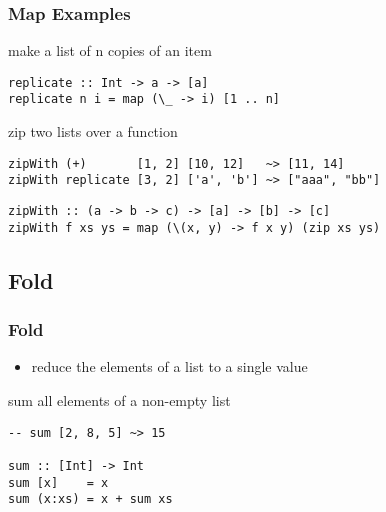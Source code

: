 \documentclass[dvipsnames]{beamer}
\theoremstyle{plain}
\begin{document}
\begin{frame}[fragile]
  \frametitle{Map Examples}

  \begin{exampleblock}{make a list of n copies of an item}
    \begin{lstlisting}[deletekeywords={replicate}]
replicate :: Int -> a -> [a]
replicate n i = map (\_ -> i) [1 .. n]
    \end{lstlisting}
  \end{exampleblock}

  \pause
  \begin{exampleblock}{zip two lists over a function}
    \begin{lstlisting}[frame=none]
zipWith (+)       [1, 2] [10, 12]   ~> [11, 14]
zipWith replicate [3, 2] ['a', 'b'] ~> ["aaa", "bb"]
    \end{lstlisting}

    \begin{lstlisting}[deletekeywords={zipWith}]
zipWith :: (a -> b -> c) -> [a] -> [b] -> [c]
zipWith f xs ys = map (\(x, y) -> f x y) (zip xs ys)
    \end{lstlisting}
  \end{exampleblock}
\end{frame}

\subsection{Fold}

\begin{frame}[fragile]
  \frametitle{Fold}

  \begin{itemize}
    \item reduce the elements of a list to a single value
  \end{itemize}

  \begin{exampleblock}{sum all elements of a non-empty list}
    \begin{lstlisting}[deletekeywords={sum}]
-- sum [2, 8, 5] ~> 15

sum :: [Int] -> Int
sum [x]    = x
sum (x:xs) = x + sum xs
    \end{lstlisting}
  \end{exampleblock}
\end{frame}
\end{document}
